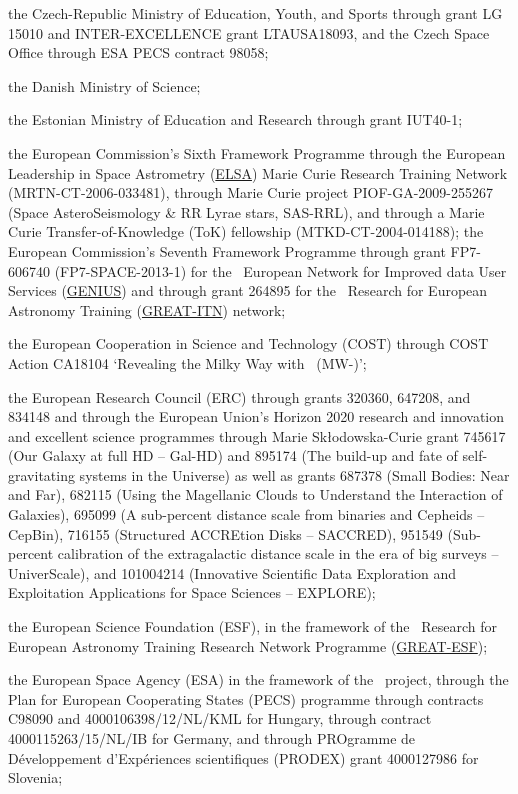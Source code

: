 the Czech-Republic Ministry of Education, Youth, and Sports through grant LG 15010 and INTER-EXCELLENCE grant LTAUSA18093, and the Czech Space Office through ESA PECS contract 98058;

the Danish Ministry of Science;

the Estonian Ministry of Education and Research through grant IUT40-1;

the European Commission's Sixth Framework Programme through the European Leadership in Space Astrometry (\href{https://www.cosmos.esa.int/web/gaia/elsa-rtn-programme}{ELSA}) Marie Curie Research Training Network (MRTN-CT-2006-033481), through Marie Curie project PIOF-GA-2009-255267 (Space AsteroSeismology \& RR Lyrae stars, SAS-RRL), and through a Marie Curie Transfer-of-Knowledge (ToK) fellowship (MTKD-CT-2004-014188); the European Commission's Seventh Framework Programme through grant FP7-606740 (FP7-SPACE-2013-1) for the \gaia\ European Network for Improved data User Services (\href{https://gaia.ub.edu/twiki/do/view/GENIUS/}{GENIUS}) and through grant 264895 for the \gaia\ Research for European Astronomy Training (\href{https://www.cosmos.esa.int/web/gaia/great-programme}{GREAT-ITN}) network;

the European Cooperation in Science and Technology (COST) through COST Action CA18104 `Revealing the Milky Way with \gaia\ (MW-\gaia)';

the European Research Council (ERC) through grants 320360, 647208, and 834148 and through the European Union's Horizon 2020 research and innovation and excellent science programmes through Marie Sk{\l}odowska-Curie grant 745617 (Our Galaxy at full HD -- Gal-HD) and 895174 (The build-up and fate of self-gravitating systems in the Universe) as well as grants 687378 (Small Bodies: Near and Far), 682115 (Using the Magellanic Clouds to Understand the Interaction of Galaxies), 695099 (A sub-percent distance scale from binaries and Cepheids -- CepBin), 716155 (Structured ACCREtion Disks -- SACCRED), 951549 (Sub-percent calibration of the extragalactic distance scale in the era of big surveys -- UniverScale), and 101004214 (Innovative Scientific Data Exploration and Exploitation Applications for Space Sciences -- EXPLORE);

the European Science Foundation (ESF), in the framework of the \gaia\ Research for European Astronomy Training Research Network Programme (\href{https://www.cosmos.esa.int/web/gaia/great-programme}{GREAT-ESF});

the European Space Agency (ESA) in the framework of the \gaia\ project, through the Plan for European Cooperating States (PECS) programme through contracts C98090 and 4000106398/12/NL/KML for Hungary, through contract 4000115263/15/NL/IB for Germany, and through PROgramme de D\'{e}veloppement d'Exp\'{e}riences scientifiques (PRODEX) grant 4000127986 for Slovenia;  

